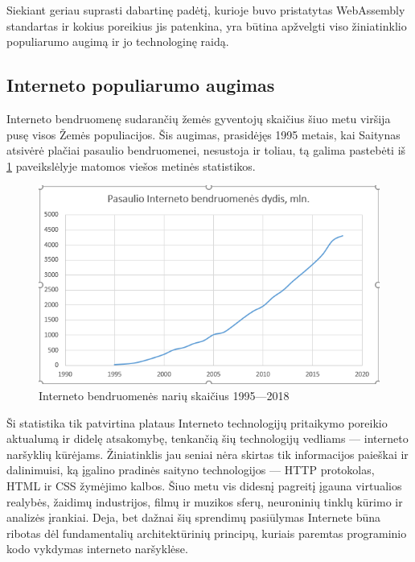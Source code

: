 \documentclass{VUMIFPSkursinis}
\begin{document}
Siekiant geriau suprasti dabartinę padėtį, kurioje buvo pristatytas WebAssembly standartas ir kokius poreikius jis patenkina, yra būtina apžvelgti viso žiniatinklio populiarumo augimą ir jo technologinę raidą.

\subsection{Interneto populiarumo augimas}

Interneto bendruomenę sudarančių žemės gyventojų skaičius šiuo metu viršija pusę visos Žemės populiacijos. Šis augimas, prasidėjęs 1995 metais, kai Saitynas atsivėrė plačiai pasaulio bendruomenei, nesustoja ir toliau, tą galima pastebėti iš \ref{fig:internet_usage} paveikslėlyje matomos viešos metinės statistikos.

\begin{figure}[h!]
  \includegraphics[scale=1]{interneto_naudojimo_statistika.png}
  \caption{Interneto bendruomenės narių skaičius 1995—2018 \cite{IWS19}}
  \label{fig:internet_usage}
\end{figure}

Ši statistika tik patvirtina plataus Interneto technologijų pritaikymo poreikio aktualumą ir didelę atsakomybę, tenkančią šių technologijų vedliams — interneto naršyklių kūrėjams. Žiniatinklis jau seniai nėra skirtas tik informacijos paieškai ir dalinimuisi, ką įgalino pradinės saityno technologijos — HTTP protokolas, HTML ir CSS žymėjimo kalbos. Šiuo metu vis didesnį pagreitį įgauna virtualios realybės, žaidimų industrijos, filmų ir muzikos sferų, neuroninių tinklų kūrimo ir analizės įrankiai. Deja, bet dažnai šių sprendimų pasiūlymas Internete būna ribotas dėl fundamentalių architektūrinių principų, kuriais paremtas programinio kodo vykdymas interneto naršyklėse.
\end{document}
